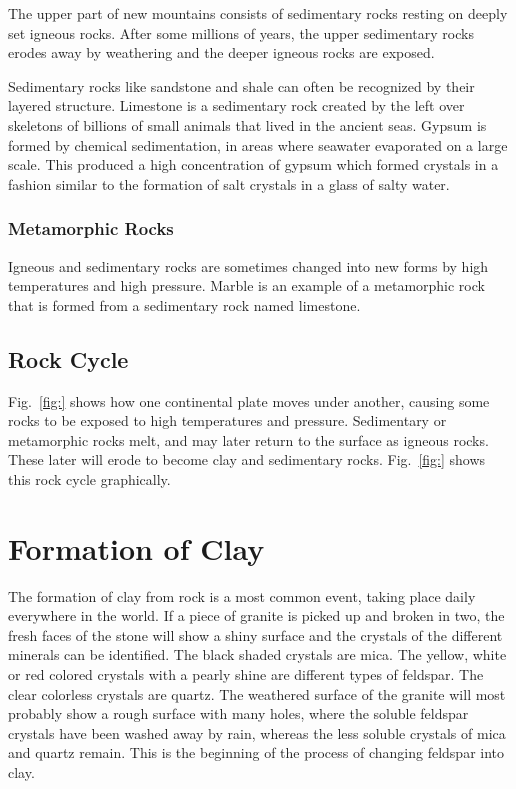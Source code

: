 The upper part of new mountains consists of sedimentary rocks resting on deeply 
set igneous rocks. After some millions of years, the upper sedimentary rocks 
erodes away by weathering and the deeper igneous rocks are exposed.

Sedimentary rocks like sandstone and shale can often be recognized by their 
layered structure. Limestone is a sedimentary rock created by the left over 
skeletons of billions of small animals that lived in the ancient seas. Gypsum 
is formed by chemical sedimentation, in areas where seawater evaporated on a 
large scale. This produced a high concentration of gypsum which formed crystals 
in a fashion similar to the formation of salt crystals in a glass of salty 
water.
\subsubsection{Metamorphic Rocks}
Igneous and sedimentary rocks are sometimes changed into new forms by high 
temperatures and high pressure. Marble is an example of a metamorphic rock that 
is formed from a sedimentary rock named limestone.
\subsection{Rock Cycle}
Fig.~\ref{fig:} shows how one continental plate moves under another, causing 
some rocks to be exposed to high temperatures and pressure. Sedimentary or 
metamorphic rocks melt, and may later return to the surface as igneous rocks. 
These later will erode to become clay and sedimentary rocks. Fig.~\ref{fig:} 
shows this rock cycle graphically.
\section{Formation of Clay}
The formation of clay from rock is a most common event, taking place daily 
everywhere in the world. If a piece of granite is picked up and broken in two, 
the fresh faces of the stone will show a shiny surface and the crystals of the 
different minerals can be identified. The black shaded crystals are mica. The 
yellow, white or red colored crystals with a pearly shine are different types 
of feldspar. The clear colorless crystals are quartz. The weathered surface of 
the granite will most probably show a rough surface with many holes, where the 
soluble feldspar crystals have been washed away by rain, whereas the less 
soluble crystals of mica and quartz remain. This is the beginning of the 
process of changing feldspar into clay.

